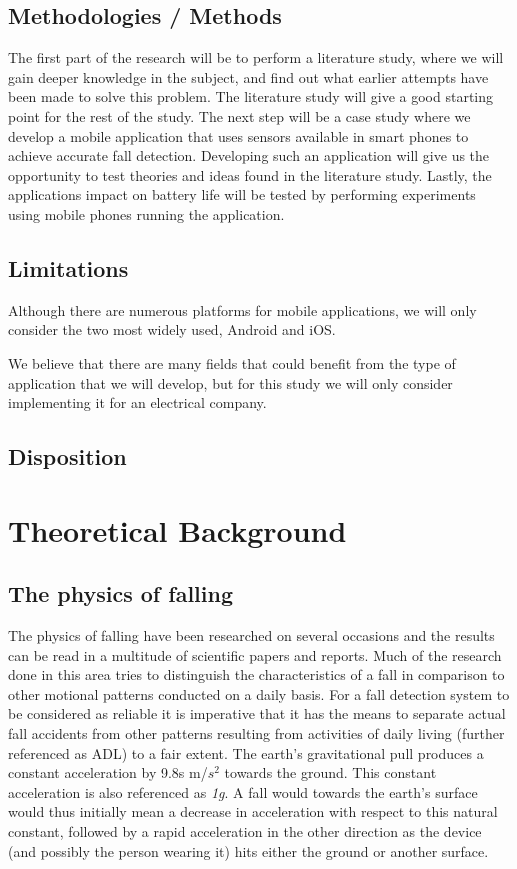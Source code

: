 \documentclass[12pt, a4paper, onecolumn]{article}
\begin{document}
		\subsection{Methodologies / Methods}
		
		The first part of the research will be to perform a literature study, where we will gain deeper knowledge in the subject, and find out what earlier attempts have been made to solve this problem. The literature study will give a good starting point for the rest of the study. The next step will be a case study where we develop a mobile application that uses sensors available in smart phones to achieve accurate fall detection. Developing such an application will give us the opportunity to test theories and ideas found in the literature study. Lastly, the applications impact on battery life will be tested by performing experiments using mobile phones running the application.
		
		\subsection{Limitations}
		
		Although there are numerous platforms for mobile applications, we will only consider the two most widely used, Android and iOS.
		
		We believe that there are many fields that could benefit from the type of application that we will develop, but for this study we will only consider implementing it for an electrical company.
		
		\subsection{Disposition}
		
		
	\newpage
	
	\section{Theoretical Background}
	
	\subsection{The physics of falling}
	
	The physics of falling have been researched on several occasions and the results can be read in a multitude of scientific papers and reports. Much of the research done in this area tries to distinguish the characteristics of a fall in comparison to other motional patterns conducted on a daily basis. For a fall detection system to be considered as reliable it is imperative that it has the means to separate actual fall accidents from other patterns resulting from activities of daily living (further referenced as ADL) to a fair extent. The earth's gravitational pull produces a constant acceleration by 9.8s m/$s^{2}$ towards the ground. This constant acceleration is also referenced as \textit{1g}. A fall would towards the earth's surface would thus initially mean a decrease in acceleration with respect to this natural constant, followed by a rapid acceleration in the other direction as the device (and possibly the person wearing it) hits either the ground or another surface.
	
\end{document}
